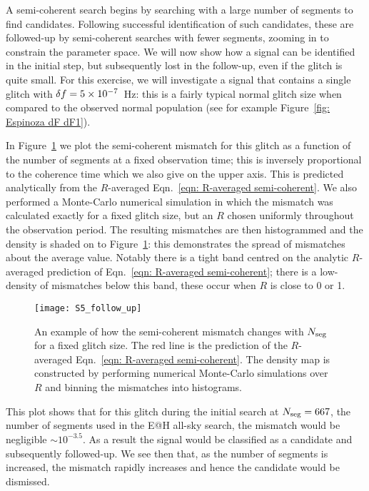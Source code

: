 \documentclass[../full_thesis/full_thesis.tex]{subfiles}
\begin{document}
A semi-coherent search begins by searching with a large number of segments to
find candidates. Following successful identification of such candidates, these
are followed-up by semi-coherent searches with fewer segments, zooming in to
constrain the parameter space. We will now show how a signal can
be identified in the initial step, but subsequently lost in the follow-up, even
if the glitch is quite small. For this exercise, we will investigate a signal
that contains a single glitch with $\delta f=5\times10^{-7}$~Hz: this is a
fairly typical normal glitch size when compared to the observed normal population (see for
example Figure~\ref{fig: Espinoza dF dF1}).

In Figure~\ref{fig: follow-up} we plot the semi-coherent mismatch for this
glitch as a function of the number of segments at a fixed observation time; this
is inversely proportional to the coherence time which we also give on the upper
axis. This is predicted
analytically from the $R$-averaged Eqn.~\eqref{eqn: R-averaged semi-coherent}.
We also performed a Monte-Carlo numerical simulation in which the mismatch was
calculated exactly for a fixed glitch size, but an $R$ chosen uniformly
throughout the observation period. The resulting mismatches are then histogrammed and the
density is shaded on to Figure~\ref{fig: follow-up}: this demonstrates the spread of
mismatches about the average value. Notably there is a tight band centred on
the analytic $R$-averaged prediction of Eqn.~\eqref{eqn: R-averaged semi-coherent};
there is a low-density of mismatches below this band, these occur when $R$ is
close to 0 or 1.

\begin{figure}[htb]
\centering
\texttt{[image: S5\_follow\_up]}
\caption{An example of how the semi-coherent mismatch changes with $N_{\textrm{seg}}$ for
         a fixed glitch size. The red line is the prediction of the $R$-averaged
         Eqn.~\eqref{eqn: R-averaged semi-coherent}. The density map is constructed
         by performing numerical Monte-Carlo simulations over $R$ and binning the mismatches
         into histograms.}
\label{fig: follow-up}
\end{figure}
This plot shows that for this glitch during the initial search at $N_{\textrm{seg}}=667$,
the number of segments used in the E@H all-sky search, the mismatch would be
negligible $\sim10^{-3.5}$. As a result the signal would be classified as a
candidate and subsequently followed-up. We see then that, as the number of
segments is increased, the mismatch rapidly increases and hence the candidate
would be dismissed.
\end{document}
